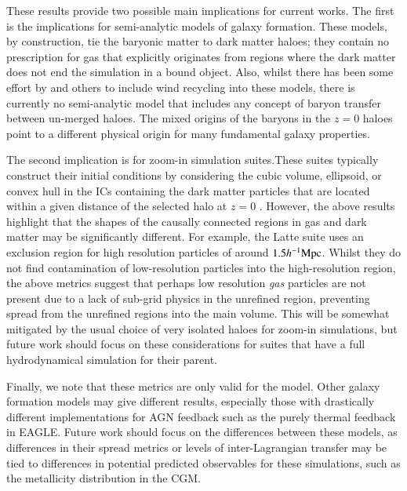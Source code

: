 These results provide two possible main implications for current works. The
first is the implications for semi-analytic models of galaxy formation. These
models, by construction, tie the baryonic matter to dark matter haloes; they
contain no prescription for gas that explicitly originates from regions where
the dark matter does not end the simulation in a bound object. Also, whilst
there has been some effort by \citet{Henriques2015} and others to include
wind recycling into these models, there is currently no semi-analytic model
that includes any concept of baryon transfer between un-merged haloes. The
mixed origins of the baryons in the $z=0$ haloes point to a different
physical origin for many fundamental galaxy properties.

The second implication is for zoom-in simulation suites.These suites
typically construct their initial conditions by considering the cubic volume,
ellipsoid, or convex hull in the ICs containing the dark matter particles
that are located within a given distance of the selected halo at $z=0$
\citep[see e.g. ][]{Onorbe2014}. However, the above results highlight that
the shapes of the causally connected regions in gas and dark matter may be
significantly different. For example, the Latte \citep{Wetzel2016} suite uses
an exclusion region for high resolution particles of around $1.5 h^{-1}{\rm Mpc}{}$.
Whilst they do not find contamination of low-resolution particles into the
high-resolution region, the above metrics suggest that perhaps low resolution
\emph{gas} particles are not present due to a lack of sub-grid physics in the
unrefined region, preventing spread from the unrefined regions into the main
volume. This will be somewhat mitigated by the usual choice of very isolated
haloes for zoom-in simulations, but future work should focus on these
considerations for suites that have a full hydrodynamical simulation for
their parent.


Finally, we note that these metrics are only valid for the \simba{} model.
Other galaxy formation models may give different results, especially those
with drastically different implementations for AGN feedback such as the
purely thermal feedback in EAGLE. Future work should focus on the differences
between these models, as differences in their spread metrics or levels of
inter-Lagrangian transfer may be tied to differences in potential predicted
observables for these simulations, such as the metallicity distribution in
the CGM.